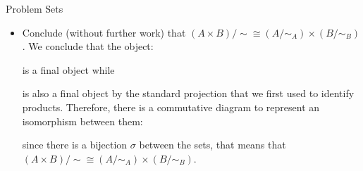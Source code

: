 \documentclass{report}
\begin{document}
\begin{exercises}{Problem Sets}
\begin{itemize}
            \item Conclude (without further work) that $(A \times B)/\sim \cong (A/\sim_{A}) \times (B/\sim_{B})$. 
                We conclude that the object:
                    \begin{center}
                    \end{center}
                is a final object while
                    \begin{center}
                    \end{center}
                is also a final object by the standard projection that we first used to identify products. Therefore, there is a commutative diagram to represent an isomorphism between them:
                    \begin{center}
                    \end{center}
                since there is a bijection $\sigma$ between the sets, that means that $(A \times B)/\sim \cong (A/\sim_{A}) \times (B/\sim_{B})$.
        \end{itemize}


\end{exercises}
\end{document}
